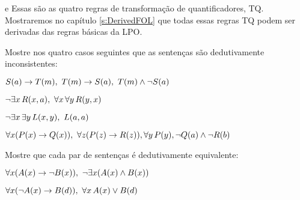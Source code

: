  
e
Essas são as quatro regras de transformação de quantificadores, TQ. Mostraremos no  capítulo \ref{s:DerivedFOL} que todas essas regras TQ podem ser derivadas das regras básicas da LPO. 


\practiceproblems
\problempart
 Mostre nos quatro casos seguintes que as sentenças são dedutivamente inconsistentes:
\begin{earg}
\item $\mathord{S}(a)\rightarrow \mathord{T}(m),\,\, \mathord{T}(m) \rightarrow \mathord{S}(a),\,\, \mathord{T}(m) \wedge \neg \mathord{S}(a)$
\item $\neg\exists x\,\mathord{R}(x,a),\,\,  \forall x\, \forall y\,\mathord{R}(y,x)$
\item $\neg\exists x\, \exists y\,\mathord{L}(x,y),\,\,  \mathord{L}(a,a)$
\item $\forall x(\mathord{P}(x) \rightarrow \mathord{Q}(x)),\,\,  \forall z(\mathord{P}(z) \rightarrow \mathord{R}(z)), \forall y\,\mathord{P}(y), \neg \mathord{Q}(a) \wedge \neg \mathord{R}(b)$
\end{earg}

\problempart
Mostre que cada par de sentenças é dedutivamente equivalente:
\begin{earg}
\item $\forall x (\mathord{A}(x)\rightarrow \neg \mathord{B}(x)),\,\,  \neg\exists x(\mathord{A}(x) \wedge \mathord{B}(x))$
\item $\forall x (\neg\mathord{A}(x)\rightarrow \mathord{B}(d)),\,\,  \forall x\,\mathord{A}(x) \vee \mathord{B}(d)$
\end{earg}

